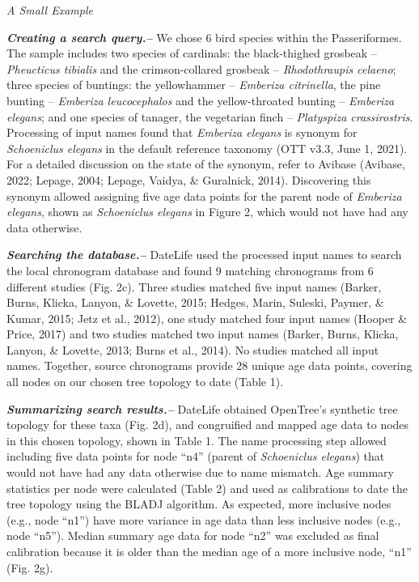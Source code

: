 \documentclass[english,man]{apa6}
\begin{document}
\begin{center}
\emph{A Small Example}
\end{center}

\textbf{\emph{Creating a search query.--}}
We chose 6 bird species within the Passeriformes. The sample includes
two species of cardinals:
the black-thighed grosbeak -- \emph{Pheucticus tibialis} and
the crimson-collared grosbeak -- \emph{Rhodothraupis celaeno};
three species of buntings:
the yellowhammer -- \emph{Emberiza citrinella},
the pine bunting -- \emph{Emberiza leucocephalos} and
the yellow-throated bunting -- \emph{Emberiza elegans};
and one species of tanager, the vegetarian finch -- \emph{Platyspiza crassirostris}.
Processing of input names found that \emph{Emberiza elegans} is synonym for \emph{Schoeniclus elegans} in the default reference taxonomy (OTT v3.3, June 1, 2021). For a detailed discussion on the state of the synonym, refer to Avibase (Avibase, 2022; Lepage, 2004; Lepage, Vaidya, \& Guralnick, 2014).
Discovering this synonym allowed assigning five age data points for the parent node of \emph{Emberiza elegans}, shown as \emph{Schoeniclus elegans} in Figure 2, which would not have had any data otherwise.

\textbf{\emph{Searching the database.--}}
DateLife used the processed input names to search the local chronogram database and found 9 matching chronograms from 6 different studies (Fig. 2c). Three studies matched five input names (Barker, Burns, Klicka, Lanyon, \& Lovette, 2015; Hedges, Marin, Suleski, Paymer, \& Kumar, 2015; Jetz et al., 2012), one study matched four input names (Hooper \& Price, 2017) and two studies matched two input names (Barker, Burns, Klicka, Lanyon, \& Lovette, 2013; Burns et al., 2014). No studies matched all input names. Together, source chronograms provide 28 unique age data points, covering all nodes on our chosen tree topology to date (Table 1).

\textbf{\emph{Summarizing search results.--}}
DateLife obtained OpenTree's synthetic tree topology for these taxa (Fig. 2d), and congruified and mapped age data to nodes in this chosen topology, shown in Table 1.
The name processing step allowed including five data points for node \enquote{n4} (parent of \emph{Schoeniclus elegans}) that would not have had any data otherwise due to name mismatch.
Age summary statistics per node were calculated (Table 2) and used as calibrations to date the tree topology using the BLADJ algorithm.
As expected, more inclusive nodes (e.g., node \enquote{n1}) have more variance in age data than less inclusive nodes (e.g., node \enquote{n5}).
Median summary age data for node \enquote{n2} was excluded as final calibration because it is older than the median age of a more inclusive node, \enquote{n1} (Fig. 2g).
\end{document}
